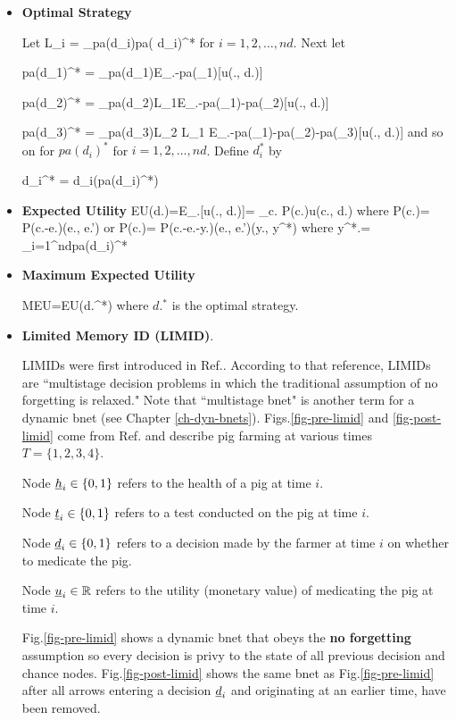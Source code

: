 \begin{itemize}


\item{\bf Optimal Strategy}

Let
\beq
L_i = \lim_{pa(d_i)\rarrow pa( d_i)^*}
\eeq
for $i=1,2, \ldots, nd$.
Next let



\beq
pa(d_1)^* = \argmax_{pa(d_1)}E_{\rvc.-pa(\rvd_1)}[u(\rvc., d.)]
\eeq


\beq 
pa(d_2)^* = \argmax_{pa(d_2)}L_1E_{\rvc.-pa(\rvd_1)-pa(\rvd_2)}[u(\rvc., d.)]
\eeq

\beq 
pa(d_3)^* = \argmax_{pa(d_3)}L_2 L_1 E_{\rvc.-pa(\rvd_1)-pa(\rvd_2)-pa(\rvd_3)}[u(\rvc., d.)]
\eeq
and so on for $pa(d_i)^*$ for $i=1,2, \ldots, nd$.
Define $d_i^*$ by

\beq
d_i^* = d_i(pa(d_i)^*)
\eeq


\item {\bf Expected Utility}
\beq
EU(d.)=E_{\rvc.}[u(\rvc., d.)]=
\sum_{c.} P(c.)u(c., d.)
\eeq
where 
\beq
P(c.)= P(c.-e.)\delta(e., e.')
\eeq
or
\beq
P(c.)= P(c.-e.-y.)\delta(e., e.')\delta(y., y^*)
\eeq
where 
\beq 
y^*.= \cup_{i=1}^{nd}pa(d_i)^*
\eeq


\item {\bf Maximum Expected Utility}

\beq
MEU=EU(d.^*)
\eeq
where $d.^*$ is the optimal strategy.


\item {\bf Limited Memory ID (LIMID)}. 

LIMIDs were first introduced 
in Ref.\cite{limid-one}. According to that reference, LIMIDs are ``multistage decision problems in which the traditional assumption of no forgetting is
relaxed." 
Note that ``multistage bnet" is another term
for a dynamic bnet (see Chapter \ref{ch-dyn-bnets}).
Figs.\ref{fig-pre-limid} and \ref{fig-post-limid}
come from Ref.\cite{limid-one} and describe pig farming
at various times $T=\{1,2,3,4\}$.

Node ${\underline{h}}_i\in\{0,1\}$
refers to the health of a pig at time $i$.

Node ${\underline{t}}_i\in \{0,1\}$ refers to a test 
conducted on the pig at time $i$.

Node ${\underline{d}}_i\in \{0,1\}$ refers to a decision 
made by the farmer at time $i$ on whether to medicate the pig.

Node ${\underline{u}}_i\in { \mathbb{R}}$ refers to the utility (monetary value)  
of medicating the pig at time $i$.

 
Fig.\ref{fig-pre-limid} shows a dynamic bnet that
obeys the {\bf no forgetting} assumption so every decision is
privy to the state of all previous decision and chance nodes.
Fig.\ref{fig-post-limid} shows the same bnet as 
Fig.\ref{fig-pre-limid} after all arrows entering a decision ${\underline{d}}_i$ and originating at an earlier time, have been removed.




\end{itemize}

